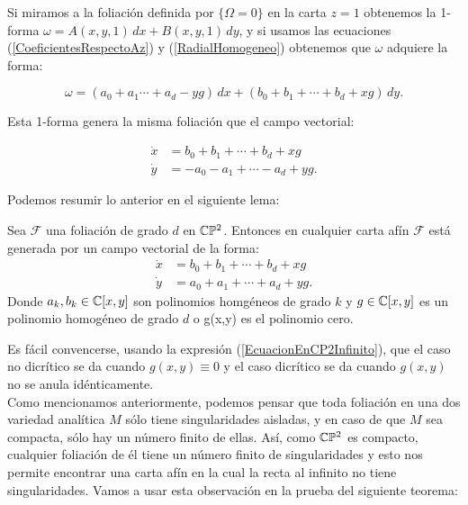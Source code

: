 Si miramos a la foliación definida por $\{ \Omega=0 \}$ en la carta $z=1$ obtenemos la 1-forma $\omega=A(x,y,1)\, dx+B(x,y,1)\, dy$, y si usamos las ecuaciones (\ref{CoeficientesRespectoAz}) y (\ref{RadialHomogeneo}) obtenemos que $\omega$ adquiere la forma:

\begin{equation}
\omega=(a_{0}+a_{1}\cdots+a_{d}-yg)\, dx+(b_{0}+b_{1}+\cdots+b_{d}+xg)\, dy.
\end{equation} 

\noindent Esta 1-forma genera la misma foliación que el campo vectorial:

\begin{equation}
\begin{aligned}
\dot{x} &= b_{0}+b_{1}+\cdots+b_{d}+xg\\
\dot{y} &= -a_{0}-a_{1}+\cdots-a_{d}+yg.
\end{aligned}
\end{equation}

Podemos resumir lo anterior en el siguiente lema:

\begin{Lema}
Sea $\mathcal{F}$ una foliación de grado $d$ en $\mathbb{C}\mathbb{P}^{2}$. Entonces en cualquier carta afín $\mathcal{F}$ está generada por un campo vectorial de la forma:
\begin{equation}
\begin{aligned}
\dot{x} &= b_{0}+b_{1}+\cdots+b_{d}+xg\\
\dot{y} &= a_{0}+a_{1}+\cdots+a_{d}+yg.
\end{aligned}
\end{equation}
Donde $a_{k},b_{k}\in\mathbb{C}[x,y]$ son polinomios homgéneos de grado $k$ y $g\in\mathbb{C}[x,y]$ es un polinomio homogéneo de grado $d$ o g(x,y) es el polinomio cero.
\end{Lema}

Es fácil convencerse, usando la expresión (\ref{EcuacionEnCP2Infinito}), que el caso no dicrítico se da cuando $g(x,y)\equiv 0$ y el caso dicrítico se da cuando $g(x,y)$ no se anula idénticamente.\\

Como mencionamos anteriormente, podemos pensar que toda foliación en una dos variedad analítica $M$ sólo tiene singularidades aisladas, y en caso de que $M$ sea compacta, sólo hay un número finito de ellas. Así, como $\mathbb{C}\mathbb{P}^{2}$ es compacto, cualquier foliación de él tiene un número finito de singularidades y esto nos permite encontrar una carta afín en la cual la recta al infinito no tiene singularidades. Vamos a usar esta observación en la prueba del siguiente teorema:

